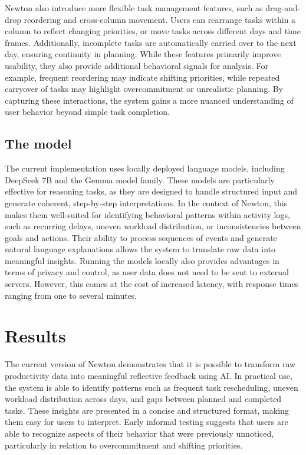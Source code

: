 \documentclass[12pt]{article}
\begin{document}
Newton also introduce more flexible task management features, such as drag-and-drop reordering and cross-column movement. Users can 
rearrange tasks within a column to reflect changing priorities, or move tasks across different days and time frames. Additionally,
 incomplete tasks are automatically carried over to the next day, ensuring continuity in planning. While these features primarily
  improve usability, they also provide additional behavioral signals for analysis. For example, frequent reordering may indicate 
  shifting priorities, while repeated carryover of tasks may highlight overcommitment or unrealistic planning. By capturing these
   interactions, the system gains a more nuanced understanding of user behavior beyond simple task completion.


\subsection{The model}
The current implementation uses locally deployed language models, including DeepSeek 7B and the Gemma model family. These models are
 particularly effective for reasoning tasks, as they are designed to handle structured input and generate coherent, step-by-step
  interpretations. In the context of Newton, this makes them well-suited for identifying behavioral patterns within activity logs,
   such as recurring delays, uneven workload distribution, or inconsistencies between goals and actions. Their ability to process 
   sequences of events and generate natural language explanations allows the system to translate raw data into meaningful insights. 
   Running the models locally also provides advantages in terms of privacy and control, as user data does not need to be sent to 
   external servers. However, this comes at the cost of increased latency, with response times ranging from one to several minutes.


\section{Results}
The current version of Newton demonstrates that it is possible to transform raw productivity data into meaningful reflective 
feedback using AI. In practical use, the system is able to identify patterns such as frequent task rescheduling, uneven workload
 distribution across days, and gaps between planned and completed tasks. These insights are presented in a concise and structured 
 format, making them easy for users to interpret. Early informal testing suggests that users are able to recognize aspects of their
  behavior that were previously unnoticed, particularly in relation to overcommitment and shifting priorities.
\end{document}
